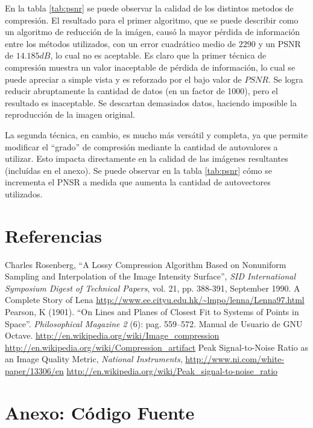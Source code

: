 \documentclass[twocolumn,a4paper,10pt]{article}
\begin{document}
En la tabla \ref{tab:psnr} se puede observar la calidad de los distintos metodos de compresión.
El resultado para el primer algoritmo, que se puede describir como un algoritmo de reducción de la imágen, causó la mayor pérdida de información entre los métodos utilizados, con un error cuadrático medio de $2290$ y un PSNR de $14.185 dB$, lo cual no es aceptable.
Es claro que la primer t\'ecnica de compresi\'on muestra un valor inaceptable de pérdida de información, lo cual se puede apreciar a simple vista y es reforzado por el bajo valor de $PSNR$. Se logra reducir abruptamente la cantidad de datos (en un factor de 1000), pero el resultado es inaceptable. Se descartan demasiados datos, haciendo imposible la reproducci\'on de la imagen original.

La segunda t\'ecnica, en cambio, es mucho m\'as vers\'atil y completa, ya que permite modificar el ``grado'' de compresi\'on mediante la cantidad de autovalores a utilizar.  Esto impacta directamente en la calidad de las imágenes resultantes (incluídas en el anexo). Se puede observar en la tabla \ref{tab:psnr} cómo se incrementa el PNSR a medida que aumenta la cantidad de autovectores utilizados.

\section*{Referencias}
\begin{thebibliography}{99}
    
    Charles Rosenberg, ``A Lossy Compression Algorithm Based on Nonuniform Sampling and Interpolation of the Image Intensity Surface'', \textit{SID International Symposium Digest of Technical Papers}, vol. 21, pp. 388-391, September 1990.
    A Complete Story of Lena \url{http://www.ee.cityu.edu.hk/~lmpo/lenna/Lenna97.html}
     Pearson, K (1901). ``On Lines and Planes of Closest Fit to Systems of Points in Space''. \textit{Philosophical Magazine 2} (6): pag. 559–572.
     Manual de Usuario de GNU Octave.
     \url{http://en.wikipedia.org/wiki/Image\_compression}
     \url{http://en.wikipedia.org/wiki/Compression\_artifact}
     Peak Signal-to-Noise Ratio as an Image Quality Metric, \textit{National Instruments}, \url{http://www.ni.com/white-paper/13306/en}
     \url{http://en.wikipedia.org/wiki/Peak_signal-to-noise_ratio}

\end{thebibliography}

\newpage
\section*{Anexo: Código Fuente}
    
    
    
\end{document}
